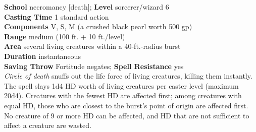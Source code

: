 \textbf{School} necromancy [death]; \textbf{Level} sorcerer/wizard 6\\
\textbf{Casting Time} 1 standard action\\
\textbf{Components} V, S, M (a crushed black pearl worth 500 gp)\\
\textbf{Range }medium (100 ft. + 10 ft./level)\\
\textbf{Area} several living creatures within a 40-ft.-radius burst\\
\textbf{Duration} instantaneous\\
\textbf{Saving Throw} Fortitude negates; \textbf{Spell Resistance} yes\\
\textit{Circle of death }snuffs out the life force of living creatures, killing them instantly. The spell slays 1d4 HD worth of living creatures per caster level (maximum 20d4). Creatures with the fewest HD are affected first; among creatures with equal HD, those who are closest to the burst's point of origin are affected first. No creature of 9 or more HD can be affected, and HD that are not sufficient to affect a creature are wasted.\\
